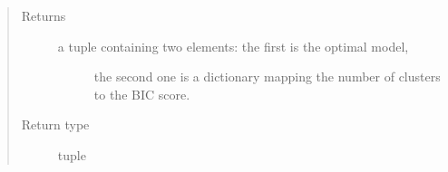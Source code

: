 \documentclass[letterpaper,10pt,english]{sphinxmanual}
\begin{document}
\begin{fulllineitems}
\begin{quote}
\begin{description}
\begin{itemize}
\end{itemize}

\item[{Returns}] \leavevmode
\begin{description}
\item[{a tuple containing two elements: the first is the optimal model,}] \leavevmode
the second one is a dictionary mapping the number of clusters to
the BIC score.

\end{description}


\item[{Return type}] \leavevmode
tuple

\end{description}\end{quote}

\end{fulllineitems}

\end{document}
